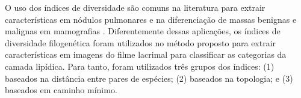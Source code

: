 O uso dos índices de diversidade são comuns na literatura para extrair características em nódulos pulmonares \cite{de2017computer,de2017lung,de2018classification} e na diferenciação de massas benignas e malignas em mamografias \cite{CARVALHO2018210, de2015classification}. Diferentemente dessas aplicações, os índices de diversidade filogenética foram utilizados no método proposto para extrair características em imagens do filme lacrimal para classificar as categorias da camada lipídica. Para tanto, foram utilizados três grupos dos índices: (1) baseados na distância entre pares de espécies; (2) baseados na topologia; e (3) baseados em caminho mínimo.

